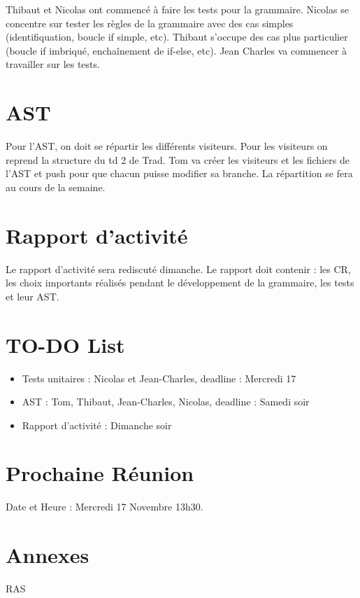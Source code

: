 \documentclass[french]{article}
\begin{document}
Thibaut et Nicolas ont commencé à faire les tests pour la grammaire. Nicolas se concentre sur tester les règles de la grammaire avec des cas simples (identifiquation, boucle if simple, etc). Thibaut s'occupe des cas plus particulier (boucle if imbriqué, enchaînement de if-else, etc). Jean Charles va commencer à travailler sur les tests.

\section*{AST}

Pour l'AST, on doit se répartir les différents visiteurs. Pour les visiteurs on reprend la structure du td 2 de Trad. Tom va créer les visiteurs et les fichiers de l'AST et push pour que chacun puisse modifier sa branche. La répartition se fera au cours de la semaine.

\section*{Rapport d'activité}

Le rapport d'activité sera rediscuté dimanche. Le rapport doit contenir : les CR, les choix importants réalisés pendant le développement de la grammaire, les tests et leur AST. 

\section*{TO-DO List}

\begin{itemize}
    \item Tests unitaires : Nicolas et Jean-Charles, deadline : Mercredi 17
    \item AST : Tom, Thibaut, Jean-Charles, Nicolas, deadline : Samedi soir
    \item Rapport d'activité : Dimanche soir
\end{itemize}

\section*{Prochaine Réunion}

Date et Heure : Mercredi 17 Novembre 13h30.

\section*{Annexes}
RAS
\end{document}
